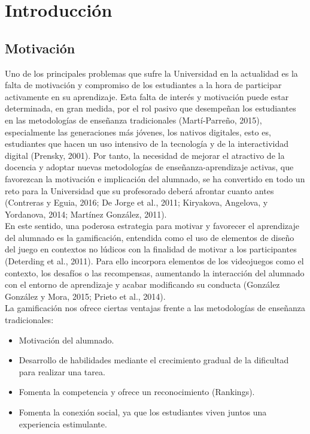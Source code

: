 \setcounter{chapter}{1}
\setcounter{section}{0}
\chapter{Introducción}

\section{Motivación\cite{Motivacion1, Motivacion2, Motivacion3, Motivacion4, Motivacion5, Motivacion6, Motivacion7, Motivacion8, Motivacion9}}

Uno de los principales problemas que sufre la Universidad en la actualidad es la falta de motivación y compromiso de los estudiantes a la hora de participar activamente en su aprendizaje. Esta falta de interés y motivación puede estar determinada, en gran medida, por el rol pasivo que desempeñan los estudiantes en las metodologías de enseñanza tradicionales (Martí-Parreño, 2015), especialmente las generaciones más jóvenes, los nativos digitales, esto es, estudiantes que hacen un uso intensivo de la tecnología y de la interactividad digital (Prensky, 2001). Por tanto, la necesidad de mejorar el atractivo de la docencia y adoptar nuevas metodologías de enseñanza-aprendizaje activas, que favorezcan la motivación e implicación del alumnado, se ha convertido en todo un reto para la Universidad que su profesorado deberá afrontar cuanto antes (Contreras y Eguia, 2016; De Jorge et al., 2011; Kiryakova, Angelova, y Yordanova, 2014; Martínez González, 2011). \\

En este sentido, una poderosa estrategia para motivar y favorecer el aprendizaje del alumnado es la gamificación, entendida como el uso de elementos de diseño del juego en contextos no lúdicos con la finalidad de motivar a los participantes (Deterding et al., 2011). Para ello incorpora elementos de los videojuegos como el contexto, los desafíos o las recompensas, aumentando la interacción del alumnado con el entorno de aprendizaje y acabar modificando su conducta (González González y Mora, 2015; Prieto et al., 2014).\\


La gamificación nos ofrece ciertas ventajas frente a las metodologías de enseñanza tradicionales:\\

\begin{itemize}
\item Motivación del alumnado.
\item Desarrollo de habilidades mediante el crecimiento gradual de la dificultad para realizar una tarea.
\item Fomenta la competencia y ofrece un reconocimiento (Rankings).
\item Fomenta la conexión social, ya que los estudiantes viven juntos una experiencia estimulante.
\end{itemize}

